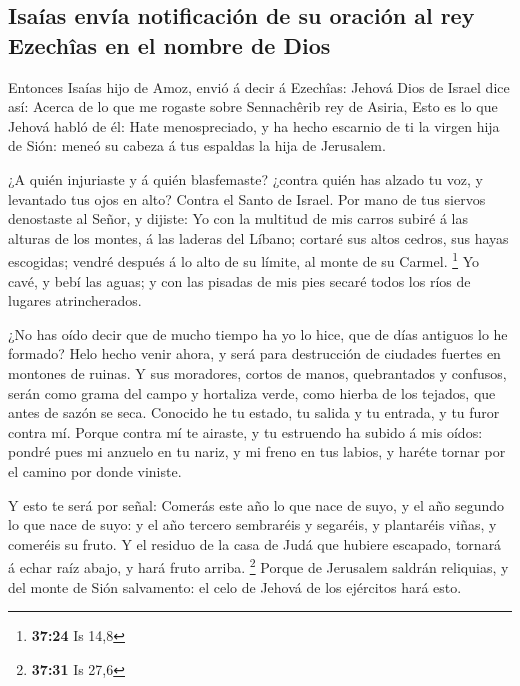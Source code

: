 \hypertarget{isauxedas-envuxeda-notificaciuxf3n-de-su-oraciuxf3n-al-rey-ezechuxeeas-en-el-nombre-de-dios}{%
\subsection{Isaías envía notificación de su oración al rey Ezechîas en
el nombre de
Dios}\label{isauxedas-envuxeda-notificaciuxf3n-de-su-oraciuxf3n-al-rey-ezechuxeeas-en-el-nombre-de-dios}}

 Entonces Isaías hijo de Amoz, envió á decir á Ezechîas:
Jehová Dios de Israel dice así: Acerca de lo que me rogaste sobre
Sennachêrib rey de Asiria,  Esto es lo que Jehová habló de
él: Hate menospreciado, y ha hecho escarnio de ti la virgen hija de
Sión: meneó su cabeza á tus espaldas la hija de Jerusalem.

 ¿A quién injuriaste y á quién blasfemaste? ¿contra quién
has alzado tu voz, y levantado tus ojos en alto? Contra el Santo de
Israel.  Por mano de tus siervos denostaste al Señor, y
dijiste: Yo con la multitud de mis carros subiré á las alturas de los
montes, á las laderas del Líbano; cortaré sus altos cedros, sus hayas
escogidas; vendré después á lo alto de su límite, al monte de su Carmel.
\footnote{\textbf{37:24} Is 14,8}  Yo cavé, y bebí las
aguas; y con las pisadas de mis pies secaré todos los ríos de lugares
atrincherados.

 ¿No has oído decir que de mucho tiempo ha yo lo hice, que
de días antiguos lo he formado? Helo hecho venir ahora, y será para
destrucción de ciudades fuertes en montones de ruinas.  Y
sus moradores, cortos de manos, quebrantados y confusos, serán como
grama del campo y hortaliza verde, como hierba de los tejados, que antes
de sazón se seca.  Conocido he tu estado, tu salida y tu
entrada, y tu furor contra mí.  Porque contra mí te
airaste, y tu estruendo ha subido á mis oídos: pondré pues mi anzuelo en
tu nariz, y mi freno en tus labios, y haréte tornar por el camino por
donde viniste.

 Y esto te será por señal: Comerás este año lo que nace de
suyo, y el año segundo lo que nace de suyo: y el año tercero sembraréis
y segaréis, y plantaréis viñas, y comeréis su fruto.  Y el
residuo de la casa de Judá que hubiere escapado, tornará á echar raíz
abajo, y hará fruto arriba. \footnote{\textbf{37:31} Is 27,6}
 Porque de Jerusalem saldrán reliquias, y del monte de Sión
salvamento: el celo de Jehová de los ejércitos hará esto.

